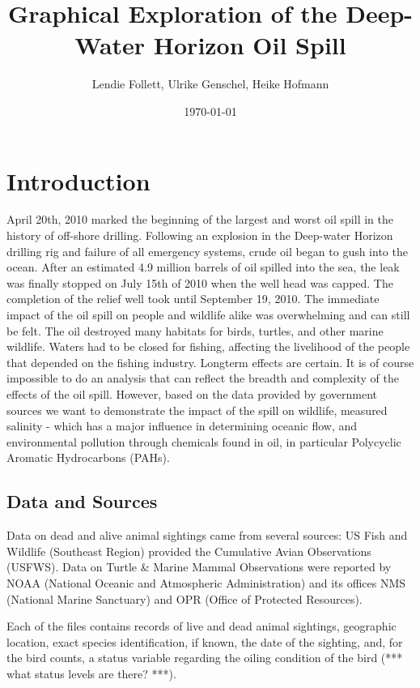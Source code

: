 \documentclass[11pt]{article}
\title{Graphical Exploration of the Deep-Water Horizon Oil Spill}
\author{Lendie Follett, Ulrike Genschel, Heike Hofmann}
\date{\today}                                           %
\begin{document}
\maketitle
\begin{abstract}
\end{abstract}
\section{Introduction}
April 20th, 2010 marked the beginning of the largest and worst oil spill in the history of off-shore drilling.  Following an explosion in the Deep-water Horizon drilling rig and failure of all emergency systems, crude oil began to gush into the ocean.  After an estimated 4.9 million barrels of oil spilled into the sea, the leak was finally stopped on July 15th of 2010 when the well head was capped.  The completion of the relief well took until September 19, 2010.  The immediate impact of the oil spill on people and wildlife alike was overwhelming and can still be felt.  The oil destroyed many habitats for birds, turtles, and other marine wildlife.  Waters had to be closed for fishing, affecting the livelihood of the people that depended on the fishing industry.  Longterm effects are certain.  It is of course impossible to do an analysis that can reflect the breadth and complexity of the effects of the oil spill.  However, based on the data provided by government sources we want to demonstrate the impact of the spill on wildlife, measured salinity - which has a major influence in determining oceanic flow, and environmental pollution through chemicals found in oil, in particular Polycyclic Aromatic Hydrocarbons (PAHs). 

\subsection{Data and Sources}
Data on dead and alive animal sightings came from several sources: US Fish and Wildlife (Southeast Region) provided the Cumulative Avian Observations (USFWS).
Data on Turtle \& Marine Mammal Observations were reported by NOAA (National Oceanic and Atmospheric Administration) and its offices NMS (National Marine Sanctuary) and OPR (Office of Protected Resources). 

Each of the files contains records of live and dead animal sightings, geographic location, exact species identification, if known, the date of the sighting, and, for the bird counts, a status variable regarding the oiling condition of the bird (*** what status levels are there? ***). 
\end{document}
